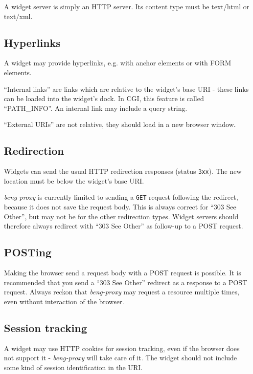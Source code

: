 \documentclass[a4paper,12pt]{article}
\begin{document}
A widget server is simply an HTTP server.  Its content type must be
text/html or text/xml.


\subsection{Hyperlinks}

A widget may provide hyperlinks, e.g. with anchor elements or with
FORM elements.

``Internal links'' are links which are relative to the widget's base
URI - these links can be loaded into the widget's dock.  In CGI, this
feature is called ``PATH\_INFO''.  An internal link may include a
query string.

``External URIs'' are not relative, they should
load in a new browser window.

\subsection{Redirection}

Widgets can send the usual HTTP redirection responses (status
\texttt{3xx}).  The new location must be below the widget's base URI.

\emph{beng-proxy} is currently limited to sending a \texttt{GET}
request following the redirect, because it does not save the request
body.  This is always correct for ``303 See Other'', but may not be
for the other redirection types.  Widget servers should therefore
always redirect with ``303 See Other'' as follow-up to a POST request.

\subsection{POSTing}

Making the browser send a request body with a POST request is
possible.  It is recommended that you send a ``303 See Other''
redirect as a response to a POST request.  Always reckon that
\emph{beng-proxy} may request a resource multiple times, even without
interaction of the browser.

\subsection{Session tracking}

A widget may use HTTP cookies for session tracking, even if the
browser does not support it - \emph{beng-proxy} will take care of it.
The widget should not include some kind of session identification in
the URI.
\end{document}

